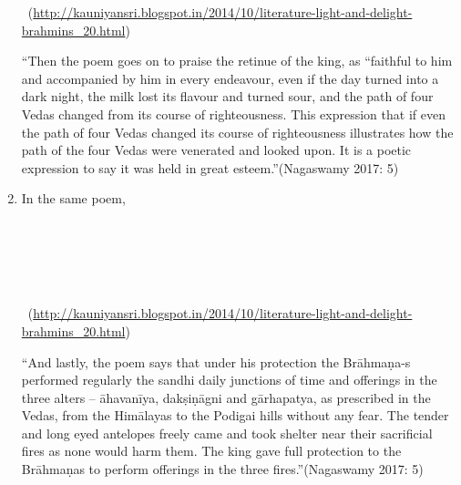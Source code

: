 \begin{enumerate}[{\rm 1.}]
\begin{myquote}
~\hfill (\url{http://kauniyansri.blogspot.in/2014/10/literature-light-and-delight-brahmins_20.html})
\end{myquote}

\begin{myquote}
“Then the poem goes on to praise the retinue of the king, as “faithful to him and accompanied by him in every endeavour, even if the day turned into a dark night, the milk lost its flavour and turned sour, and the path of four Vedas changed from its course of righteousness. This expression that if even the path of four Vedas changed its course of righteousness illustrates how the path of the four Vedas were venerated and looked upon. It is a poetic expression to say it was held in great esteem.”\hfill (Nagaswamy 2017: 5)
\end{myquote}


 \item 
 In the same poem,

\begin{myquote}
 \\\\\\\\

~\hfill (\url{http://kauniyansri.blogspot.in/2014/10/literature-light-and-delight-brahmins_20.html})
\end{myquote}

\begin{myquote}
“And lastly, the poem says that under his protection the Brāhmaṇa-s performed regularly the sandhi daily junctions of time and offerings in the three alters – āhavanīya, dakṣiṇāgni and gārhapatya, as prescribed in the Vedas, from the Himālayas to the Podigai hills without any fear. The tender and long eyed antelopes freely came and took shelter near their sacrificial fires as none would harm them. The king gave full protection to the Brāhmaṇas to perform offerings in the three fires.”\hfill (Nagaswamy 2017: 5)
\end{myquote}



\end{enumerate}
